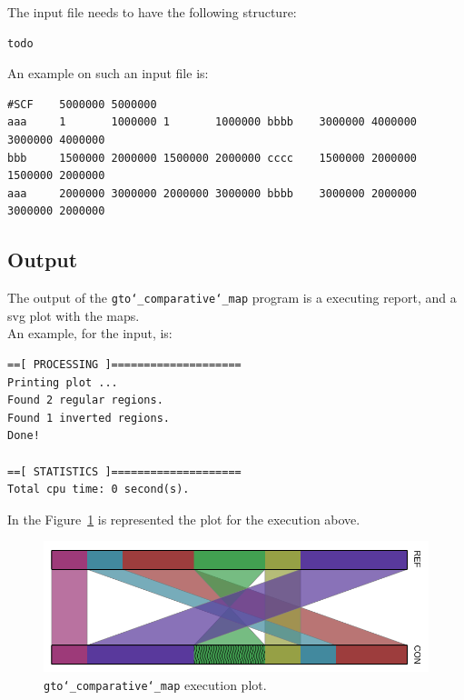 The input file needs to have the following structure:
\begin{lstlisting}
todo
\end{lstlisting}
An example on such an input file is:
\begin{lstlisting}
#SCF    5000000 5000000
aaa     1       1000000 1       1000000 bbbb    3000000 4000000 3000000 4000000
bbb     1500000 2000000 1500000 2000000 cccc    1500000 2000000 1500000 2000000
aaa     2000000 3000000 2000000 3000000 bbbb    3000000 2000000 3000000 2000000
\end{lstlisting}

\subsection*{Output}
The output of the \texttt{gto\char`_comparative\char`_map} program is a executing report, and a svg plot with the maps.\\
An example, for the input, is:
\begin{lstlisting}
==[ PROCESSING ]====================
Printing plot ...
Found 2 regular regions. 
Found 1 inverted regions.
Done!                       

==[ STATISTICS ]====================
Total cpu time: 0 second(s).
\end{lstlisting}

In the Figure~\ref{fig:gtoComparativeMap} is represented the plot for the execution above.

 \begin{figure}[!h]
  \centering
  \includegraphics[scale=0.6]{./images/gto_comparative_map.png}
  \caption{\texttt{gto\char`_comparative\char`_map} execution plot.}
  \label{fig:gtoComparativeMap}
 \end{figure}
